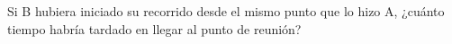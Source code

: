 Si B hubiera iniciado su recorrido desde el mismo punto que lo hizo A, ¿cuánto tiempo habría tardado en llegar al punto de reunión?

\begin{oneparchoices}
\end{oneparchoices}
